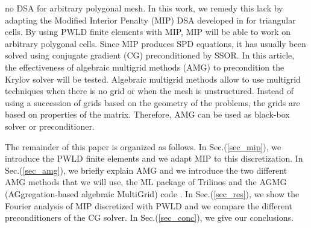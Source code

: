 no DSA for arbitrary polygonal mesh. In this work, we remedy this lack by adapting 
the Modified Interior Penalty (MIP) DSA developed in \cite{mip} for triangular 
cells. By using PWLD finite elements with MIP, MIP will be able to work on 
arbitrary polygonal cells. Since MIP produces SPD equations, it has usually 
been solved using conjugate gradient (CG) preconditioned by SSOR. In this
article, the effectiveness of algebraic multigrid methods (AMG) to precondition 
the Krylov solver \cite{amg,amg_course} will be tested. Algebraic multigrid methods 
allow to use multigrid techniques when there is no grid or when the mesh is 
unstructured. Instead of using a succession of grids based on the geometry of the 
problems, the grids are based on properties of the matrix. Therefore, AMG can
be used as black-box solver or preconditioner.

The remainder of this paper is organized as follows. In Sec.(\ref{sec_mip}),
we introduce the PWLD finite elements and we adapt MIP to this discretization. 
In Sec.(\ref{sec_amg}), we briefly explain AMG and we introduce the two different 
AMG methods that we will use, the ML package of Trilinos \cite{ml_guide} and the 
AGMG (AGgregation-based algebraic MultiGrid) code \cite{agmg_guide}. In 
Sec.(\ref{sec_res}), we show the Fourier analysis of MIP discretized with PWLD
and we compare the different preconditioners of the CG solver. In 
Sec.(\ref{sec_conc}), we give our conclusions.
